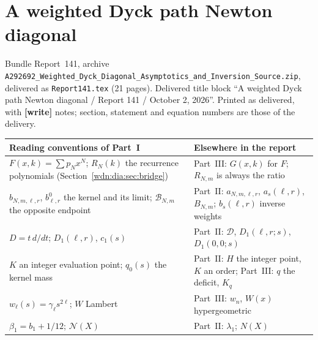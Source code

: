 \documentclass[11pt,letterpaper]{article}
\theoremstyle{remark}\newtheorem{remark}[theorem]{Remark}
\newcommand{\dd}{\mathcal D}
\newcommand{\file}[1]{\nolinkurl{#1}}
\newcommand{\partsource}[1]{\par\noindent\begin{minipage}{\textwidth}\small #1\end{minipage}\par\medskip}
\newcommand{\parteqs}[1]{\setcounter{equation}{0}%
 \renewcommand{\theequation}{#1\arabic{equation}}%
 \renewcommand{\theHequation}{#1\arabic{equation}}}
\begin{document}
\part{A weighted Dyck path Newton diagonal}\label{wdn:dia:part}
\parteqs{}
\partsource{Bundle Report~141, archive \file{A292692_Weighted_Dyck_Diagonal_Asymptotics_and_Inversion_Source.zip}, delivered as \file{Report141.tex} (21 pages). Delivered title block ``A weighted Dyck path Newton diagonal / Report 141 / October 2, 2026''. Printed as delivered, with \textbf{[write]} notes; section, statement and equation numbers are those of the delivery.}
\begin{center}
\small
\begin{tabular}{@{}>{\raggedright\arraybackslash}p{} >{\raggedright\arraybackslash}p{}@{}}
\toprule
Reading conventions of Part~I & Elsewhere in the report\\
\midrule
$F(x,k)=\sum p_Nx^N$; $R_N(k)$ the recurrence polynomials (Section~\ref{wdn:dia:sec:bridge}) & Part~III: $G(x,k)$ for $F$; $R_{N,m}$ is always the ratio\\
$b_{N,m,\ell,r}$, $b^0_{\ell,r}$ the kernel and its limit; $\mathcal B_{N,m}$ the opposite endpoint & Part~II: $a_{N,m,\ell,r}$, $a_s(\ell,r)$, $B_{N,m}$; $b_s(\ell,r)$ inverse weights\\
$D=t\,d/dt$; $D_1(\ell,r)$, $c_1(s)$ & Part~II: $\dd$, $D_1(\ell,r;s)$, $D_1(0,0;s)$\\
$K$ an integer evaluation point; $q_0(s)$ the kernel mass & Part~II: $H$ the integer point, $K$ an order; Part~III: $q$ the deficit, $K_q$\\
$w_\ell(s)=\gamma_\ell s^{2\ell}$; $W$ Lambert & Part~III: $w_n$, $W(x)$ hypergeometric\\
$\beta_1=b_1+1/12$; $\mathcal N(X)$ & Part~II: $\lambda_1$; $N(X)$\\
\bottomrule
\end{tabular}
\end{center}
\end{document}
